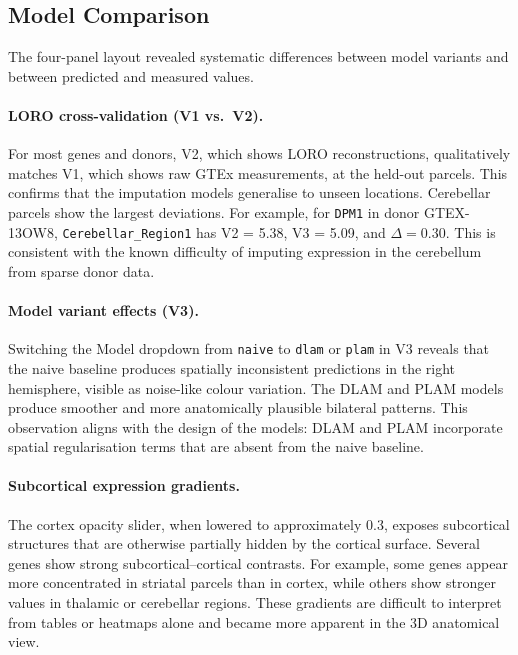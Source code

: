 \documentclass[11pt,letterpaper]{article}
\begin{document}
\subsection{Model Comparison}

The four-panel layout revealed systematic differences between
model variants and between predicted and measured values.

\paragraph{LORO cross-validation (V1 vs.\ V2).}
For most genes and donors, V2, which shows LORO reconstructions,
qualitatively matches V1, which shows raw GTEx measurements, at the
held-out parcels.
This confirms that the imputation models generalise to unseen locations.
Cerebellar parcels show the largest deviations. For example, for
\texttt{DPM1} in donor GTEX-13OW8, \texttt{Cerebellar\_Region1}
has V2 = 5.38, V3 = 5.09, and $\Delta = 0.30$.
This is consistent with the known difficulty of imputing expression in
the cerebellum from sparse donor data.

\paragraph{Model variant effects (V3).}
Switching the Model dropdown from \texttt{naive} to \texttt{dlam}
or \texttt{plam} in V3 reveals that the naive baseline produces
spatially inconsistent predictions in the right hemisphere, visible as
noise-like colour variation.
The DLAM and PLAM models produce smoother and more anatomically plausible
bilateral patterns.
This observation aligns with the design of the models: DLAM and PLAM
incorporate spatial regularisation terms that are absent from the naive
baseline.

\paragraph{Subcortical expression gradients.}
The cortex opacity slider, when lowered to approximately 0.3, exposes
subcortical structures that are otherwise partially hidden by the cortical
surface.
Several genes show strong subcortical--cortical contrasts.
For example, some genes appear more concentrated in striatal parcels than
in cortex, while others show stronger values in thalamic or cerebellar
regions.
These gradients are difficult to interpret from tables or heatmaps alone
and became more apparent in the 3D anatomical view.
\end{document}
